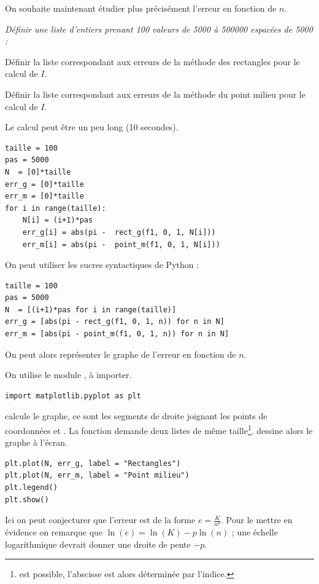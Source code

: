 On souhaite maintenant étudier plus précisément  l'erreur en fonction de $n$.
\begin{Exercise}\it
Définir une liste d'entiers  prenant 100 valeurs de 5000 à 500000 espacées de 5000 :


Définir la liste  correspondant aux erreurs de la méthode des rectangles pour le calcul de $I$.

Définir la liste  correspondant aux erreurs de la méthode du point milieu pour le calcul de $I$.

Le calcul peut être un peu long (10 secondes).
\end{Exercise}
\begin{Answer}
\begin{lstlisting}
taille = 100 
pas = 5000
N  = [0]*taille
err_g = [0]*taille
err_m = [0]*taille
for i in range(taille):
    N[i] = (i+1)*pas
    err_g[i] = abs(pi -  rect_g(f1, 0, 1, N[i]))
    err_m[i] = abs(pi -  point_m(f1, 0, 1, N[i]))
\end{lstlisting}

On peut utiliser les sucres syntactiques de Python :
\begin{lstlisting}
taille = 100 
pas = 5000
N  = [(i+1)*pas for i in range(taille)]
err_g = [abs(pi - rect_g(f1, 0, 1, n)) for n in N]
err_m = [abs(pi - point_m(f1, 0, 1, n)) for n in N]
\end{lstlisting}
\end{Answer}
\medskip

On peut alors représenter le graphe de l'erreur en fonction de $n$.

On utilise le module , à importer.
\begin{lstlisting}
import matplotlib.pyplot as plt
\end{lstlisting}

 calcule le graphe, ce sont les segments de droite joignant les points de coordonnées  et . La fonction demande deux listes de même taille\footnote{ est possible, l'abscisse est alors déterminée par l'indice.}.  dessine alors le graphe à l'écran.
\begin{lstlisting}
plt.plot(N, err_g, label = "Rectangles")
plt.plot(N, err_m, label = "Point milieu")
plt.legend()
plt.show()
\end{lstlisting}
Ici on peut conjecturer que l'erreur est de la forme $e = \frac K{n^p}$. Pour le mettre en évidence on remarque que $\ln(e) = \ln(K) - p \ln(n)$ ; une échelle logarithmique devrait donner une droite de pente $-p$.

